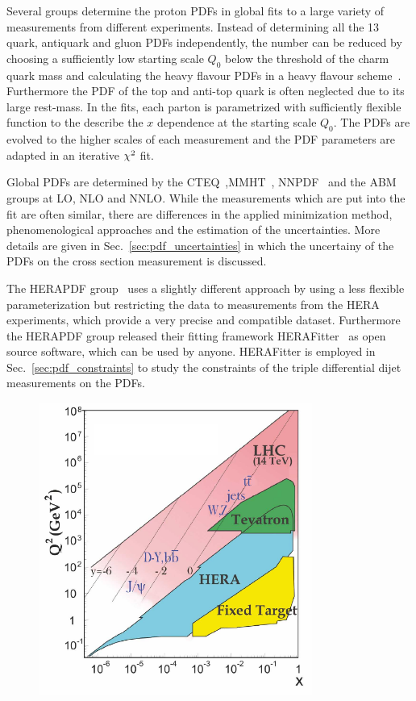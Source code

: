 Several groups determine the proton PDFs in global fits to a large variety of
measurements from different experiments. Instead of determining all the 13
quark, antiquark and gluon PDFs independently, the number can be reduced by
choosing a sufficiently low starting scale $Q_0$ below the threshold of the
charm quark mass and calculating the heavy flavour PDFs in a heavy flavour
scheme~\cite{rt_scheme}. Furthermore the PDF of the top and anti-top quark is
often neglected due to its large rest-mass. In the fits, each parton is
parametrized with sufficiently flexible function to the describe the $x$
dependence at the starting scale $Q_0$. The PDFs are evolved to the higher
scales of each measurement and the PDF parameters are adapted in an iterative
$\chi^2$ fit.

Global PDFs are determined by the
CTEQ~\cite{Dulat:2015mca},MMHT~\cite{Harland-Lang:2014zoa},
NNPDF~\cite{Ball:2014uwa} and the ABM~\cite{Alekhin:2013nda} groups at LO, NLO
and NNLO. While the measurements which are put into the fit are often similar,
there are differences in the applied minimization method, phenomenological
approaches and the estimation of the uncertainties. More details are given in
Sec.~\ref{sec:pdf_uncertainties} in which the uncertainy of the PDFs on the
cross section measurement is discussed.

The HERAPDF group~\cite{Abramowicz:2015mha} uses a slightly different approach
by using a less flexible parameterization but restricting the data to
measurements from the HERA experiments, which provide a very precise and
compatible dataset. Furthermore the HERAPDF group released their fitting
framework HERAFitter~\cite{Alekhin:2014irh} as open source software, which can
be used by anyone.  HERAFitter is employed in Sec.~\ref{sec:pdf_constraints} to
study the constraints of the triple differential dijet measurements on the PDFs.

\begin{figure}[htb] 
    \centering
    \includegraphics[width=0.8\textwidth]{figures/sm_model/phasespace.pdf}\hfill
    \caption[Kinematic phase space of the experiments]{} 
    \label{fig:fundamental_couplings} 
\end{figure}


